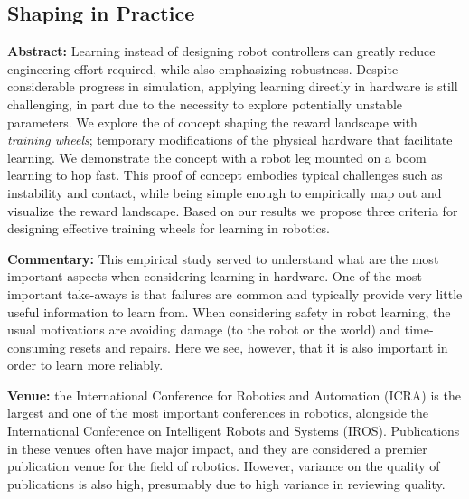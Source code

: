 \subsection{Shaping in Practice}
\textbf{Abstract: }
Learning instead of designing robot controllers can greatly reduce engineering effort required, while also emphasizing robustness. Despite considerable progress in simulation, applying learning directly in hardware is still challenging, in part due to the necessity to explore potentially unstable parameters. We explore the of concept shaping the reward landscape with \emph{training wheels}; temporary modifications of the physical hardware that facilitate learning. We demonstrate the concept with a robot leg mounted on a boom learning to hop fast. This proof of concept embodies typical challenges such as instability and contact, while being simple enough to empirically map out and visualize the reward landscape. Based on our results we propose three criteria for designing effective training wheels for learning in robotics. \par
\textbf{Commentary: }
This empirical study served to understand what are the most important aspects when considering learning in hardware. One of the most important take-aways is that failures are common and typically provide very little useful information to learn from. When considering safety in robot learning, the usual motivations are avoiding damage (to the robot or the world) and time-consuming resets and repairs. Here we see, however, that it is also important in order to learn more reliably. \par

\textbf{Venue: }the International Conference for Robotics and Automation (ICRA) is the largest and one of the most important conferences in robotics, alongside the International Conference on Intelligent Robots and Systems (IROS). Publications in these venues often have major impact, and they are considered a premier publication venue for the field of robotics. However, variance on the quality of publications is also high, presumably due to high variance in reviewing quality.

